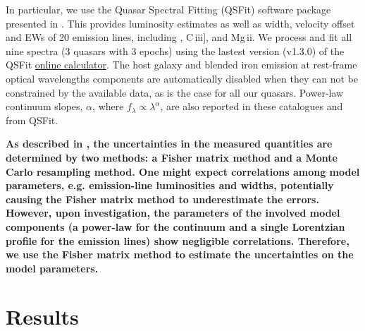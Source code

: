 \documentclass[fleqn,usenatbib]{mnras}
\begin{document}
In particular, we use the Quasar Spectral Fitting (QSFit) software
package presented in \citet{Calderone2017}. This provides luminosity
estimates as well as width, velocity offset and EWs of 20 emission
lines, including \civ, C\,{\sc iii}], and {Mg\,{\sc ii}}. We process and fit
all nine spectra (3 quasars with 3 epochs) using the lastest version
(v1.3.0) of the QSFit
\href{https://qsfit.inaf.it/cat_1.30/onlinefit.php}{online
calculator}. The host galaxy and blended iron emission at rest-frame
optical wavelengths components are automatically disabled when they
can not be constrained by the available data, as is the case for all
our quasars.  Power-law continuum slopes, $\alpha$, where $f_{\lambda}
\propto \lambda^{\alpha}$, are also reported in these catalogues and
from QSFit.

{\bf As described in \citet{Calderone2017}, the uncertainties in the
measured quantities are determined by two methods: a Fisher matrix
method and a Monte Carlo resampling method.  One might expect
correlations among model parameters, e.g. emission-line luminosities
and widths, potentially causing the Fisher matrix method to
underestimate the errors.  However, upon investigation, the parameters
of the involved model components (a power-law for the continuum and a
single Lorentzian profile for the emission lines) show negligible
correlations. Therefore, we use the Fisher matrix method to estimate
the uncertainties on the model parameters.}



\section{Results}
\end{document}
